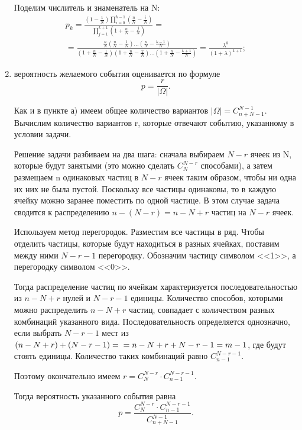 \begin{enumerate}[label=\alph*)]
Поделим числитель и знаменатель на N:
\begin{equation*}
\begin{split}
p_k =
\frac{ \left( 1- \frac{1}{N} \right) \prod \limits_{i=0}^{k-1} \left( \frac{n}{N} - \frac{i}{N} \right) }{ \prod \limits_{j=1}^{k+1} \left( 1+ \frac{n}{N} - \frac{j}{N} \right) } = \\
= \frac{ \frac{n}{N} \left( \frac{n}{N} - \frac{1}{N} \right) \dotsc \left( \frac{n}{N} - \frac{k-1}{N} \right) }{ \left( 1+ \frac{n}{N} - \frac{1}{N} \right) \left( 1+ \frac{n}{N} - \frac{2}{N} \right) \dotsc \left( 1+ \frac{n}{N} - \frac{k+1}{N} \right) } =
\frac{ \lambda^k}{ \left( 1+ \lambda \right)^{k+1}};
\end{split}
\end{equation*}

\item вероятность желаемого события оценивается по формуле
$$ p =
\frac{r}{| \Omega |}.$$

Как и в пункте а) имеем общее количество вариантов $ | \Omega | = C_{n+N-1}^{N-1} $.
Вычислим количество вариантов r, которые отвечают событию, указанному в условии задачи.

Решение задачи разбиваем на два шага:
сначала выбираем $ N - r $ ячеек из N, которые будут занятыми (это можно сделать $ C_{N}^{N-r} $ способами),
а затем размещаем n одинаковых частиц в $ N - r $ ячеек таким образом, чтобы ни одна их них не была пустой.
Поскольку все частицы одинаковы, то в каждую ячейку можно заранее поместить по одной частице.
В этом случае задача сводится к распределению $ n - \left( N - r \right) = n - N + r $ частиц на $ N - r $ ячеек.

Используем метод перегородок.
Разместим все частицы в ряд.
Чтобы отделить частицы, которые будут находиться в разных ячейках, поставим между ними $ N - r - 1 $ перегородку.
Обозначим частицу символом <<1>>, а перегородку символом <<0>>.

Тогда распределение частиц по ячейкам характеризуется последовательностью из $ n - N + r $ нулей и $ N - r - 1 $ единицы.
Количество способов, которыми можно распределить $ n - N + r $ частиц, совпадает с количеством разных комбинаций указанного вида.
Последовательность определяется однозначно, если выбрать $ N - r - 1 $ мест из
$ \left( n - N + r \right) + \left( N - r - 1 \right) = \\
= n - N + r + N - r - 1 = m - 1 $,
где будут стоять единицы.
Количество таких комбинаций равно $ C_{n-1}^{N - r - 1} $.

Поэтому окончательно имеем $ r = C_{N}^{N-r} \cdot C_{n-1}^{N - r - 1} $.

Тогда вероятность указанного события равна
$$ p =
\frac{C_{N}^{N-r} \cdot C_{n-1}^{N - r - 1}}{C_{n+N-1}^{N-1}}.$$
\end{enumerate}
